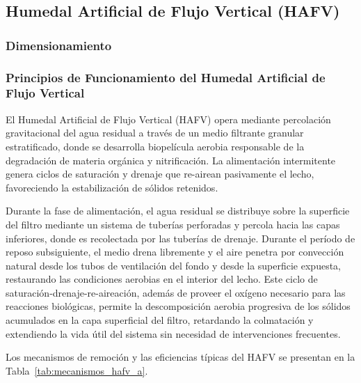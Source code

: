 \documentclass[12pt,a4paper]{article}
\begin{document}
\subsection{Humedal Artificial de Flujo Vertical (HAFV)}

\subsubsection{Dimensionamiento}

\subsubsection*{Principios de Funcionamiento del Humedal Artificial de Flujo Vertical}

El Humedal Artificial de Flujo Vertical (HAFV) opera mediante percolación gravitacional del agua residual a través de un medio filtrante granular estratificado, donde se desarrolla biopelícula aerobia responsable de la degradación de materia orgánica y nitrificación. La alimentación intermitente genera ciclos de saturación y drenaje que re-airean pasivamente el lecho, favoreciendo la estabilización de sólidos retenidos.

Durante la fase de alimentación, el agua residual se distribuye sobre la superficie del filtro mediante un sistema de tuberías perforadas y percola hacia las capas inferiores, donde es recolectada por las tuberías de drenaje. Durante el período de reposo subsiguiente, el medio drena libremente y el aire penetra por convección natural desde los tubos de ventilación del fondo y desde la superficie expuesta, restaurando las condiciones aerobias en el interior del lecho. Este ciclo de saturación-drenaje-re-aireación, además de proveer el oxígeno necesario para las reacciones biológicas, permite la descomposición aerobia progresiva de los sólidos acumulados en la capa superficial del filtro, retardando la colmatación y extendiendo la vida útil del sistema sin necesidad de intervenciones frecuentes.

Los mecanismos de remoción y las eficiencias típicas del HAFV se presentan en la Tabla~\ref{tab:mecanismos_hafv_a}.
\end{document}
